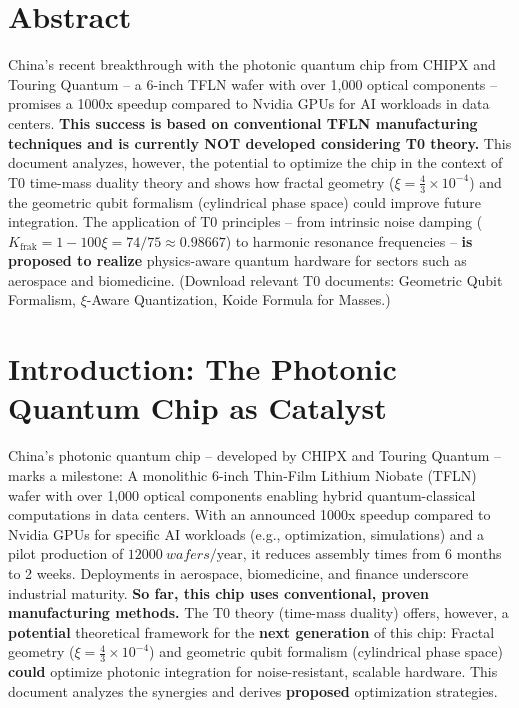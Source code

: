 \hfuzz=200pt

\section*{Abstract}
		China's recent breakthrough with the photonic quantum chip from CHIPX and Touring Quantum – a 6-inch TFLN wafer with over 1,000 optical components – promises a 1000x speedup compared to Nvidia GPUs for AI workloads in data centers. \textbf{This success is based on conventional TFLN manufacturing techniques and is currently NOT developed considering T0 theory.} This document analyzes, however, the potential to optimize the chip in the context of T0 time-mass duality theory and shows how fractal geometry ($\xi = \frac{4}{3} \times 10^{-4}$) and the geometric qubit formalism (cylindrical phase space) could improve future integration. The application of T0 principles – from intrinsic noise damping ($K_{\text{frak}} = 1-100\xi = 74/75 \approx 0.98667$) to harmonic resonance frequencies – \textbf{is proposed to realize} physics-aware quantum hardware for sectors such as aerospace and biomedicine.
		(Download relevant T0 documents: Geometric Qubit Formalism, $\xi$-Aware Quantization, Koide Formula for Masses.)

	
	\section{Introduction: The Photonic Quantum Chip as Catalyst}
	
	China's photonic quantum chip – developed by CHIPX and Touring Quantum – marks a milestone: A monolithic 6-inch Thin-Film Lithium Niobate (TFLN) wafer with over 1,000 optical components enabling hybrid quantum-classical computations in data centers. With an announced 1000x speedup compared to Nvidia GPUs for specific AI workloads (e.g., optimization, simulations) and a pilot production of $\SI{12000}{wafers}/\text{year}$, it reduces assembly times from 6 months to 2 weeks. Deployments in aerospace, biomedicine, and finance underscore industrial maturity. \textbf{So far, this chip uses conventional, proven manufacturing methods.} The T0 theory (time-mass duality) offers, however, a \textbf{potential} theoretical framework for the \textbf{next generation} of this chip: Fractal geometry ($\xi = \frac{4}{3} \times 10^{-4}$) and geometric qubit formalism (cylindrical phase space) \textbf{could} optimize photonic integration for noise-resistant, scalable hardware. This document analyzes the synergies and derives \textbf{proposed} optimization strategies.
	
